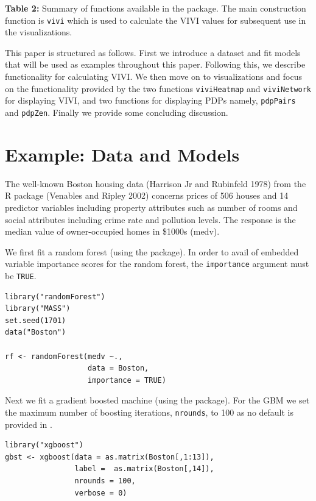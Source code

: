 \textbf{Table 2:} Summary of functions available in the  package. The main construction function is \texttt{vivi} which is used to calculate the VIVI values for subsequent use in the visualizations.

This paper is structured as follows. First we introduce a dataset and fit models that will be used as examples throughout this paper. Following this, we describe  functionality for calculating VIVI. We then move on to visualizations and focus on the functionality provided by the two functions \texttt{viviHeatmap} and \texttt{viviNetwork} for displaying VIVI, and two functions for displaying PDPs namely, \texttt{pdpPairs} and \texttt{pdpZen}. Finally we provide some concluding discussion.

\hypertarget{datamodel}{%
\section{Example: Data and Models}\label{datamodel}}

The well-known Boston housing data (Harrison Jr and Rubinfeld 1978) from the R package  (Venables and Ripley 2002) concerns prices of 506 houses and 14 predictor variables including property attributes such as number of rooms and social attributes including crime rate and pollution levels. The response is the median value of owner-occupied homes in \$1000s (medv).

We first fit a random forest (using the  package). In order to avail of embedded variable importance scores for the random forest, the \texttt{importance} argument must be \texttt{TRUE}.

\begin{verbatim}
library("randomForest") 
library("MASS")
set.seed(1701)  
data("Boston")

rf <- randomForest(medv ~., 
                   data = Boston, 
                   importance = TRUE)
\end{verbatim}

Next we fit a gradient boosted machine (using the  package). For the GBM we set the maximum number of boosting iterations, \texttt{nrounds}, to 100 as no default is provided in .

\begin{verbatim}
library("xgboost") 
gbst <- xgboost(data = as.matrix(Boston[,1:13]), 
                label =  as.matrix(Boston[,14]),
                nrounds = 100,
                verbose = 0)
\end{verbatim}

